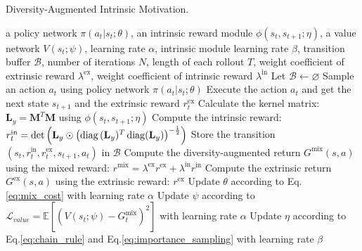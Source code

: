 \begin{algorithm}[t]
	\caption{\label{alg:all} Diversity-Augmented Intrinsic Motivation.
	}
	\begin{algorithmic}[1]
		\REQUIRE a policy network $\pi(a_{t}|s_{t};\theta)$, an intrinsic reward module $\phi(s_{t},s_{t+1};\eta)$, a value network $V(s_{t};\psi)$, learning rate $\alpha$, intrinsic module learning rate $\beta$, transition buffer $\mathcal{B}$, number of iterations $N$, length of each rollout $T$, weight coefficient of extrinsic reward $\lambda^{\text{ex}}$, weight coefficient of intrinsic reward $\lambda^{\text{in}}$
		\STATE Let $\mathcal{B} \leftarrow \varnothing$
        \STATE Sample an action $a_{t}$ using policy network $\pi(a_{t}|s_{t};\theta)$
        \STATE Execute the action $a_{t}$ and get the next state $s_{t+1}$ and the extrinsic reward $r^{\text{ex}}_{t}$
		\STATE Calculate the kernel matrix: $\textbf{L}_{y}=\mathbf{M}^{T}\mathbf{M}$ using $\phi(s_{t},s_{t+1};\eta)$
		\STATE Compute the intrinsic reward: $r_{t}^{\text{in}} = \det\left(\mathbf{L}_{y} \odot \left(\operatorname{diag}{(\mathbf{L}_{y}})^{T}\operatorname{diag}({\mathbf{L}_{y}})\right)^{-\frac{1}{2}}\right)$
		\STATE Store the transition $(s_{t}, r^{\text{in}}_{t}, r^{\text{ex}}_{t}, s_{t+1}, a_{t})$ in $\mathcal{B}$
		\ENDFOR
		\STATE Compute the diversity-augmented return $G^{\text{mix}}(s, a)$ using the mixed reward: $r^{\text{mix}}=\lambda^{\text{ex}}r^{\text{ex}} + \lambda^{\text{in}}r^{\text{in}}$
		\STATE Compute the extrinsic return $G^{\text{ex}}(s, a)$ using the extrinsic reward: $r^{\text{ex}}$
		\STATE Update $\theta$ according to Eq.\eqref{eq:mix_cost} with learning rate $\alpha$
		\STATE Update $\psi$ according to $\mathcal{L}_{value}=\mathbb{E}[(V(s_{t};\psi)-G^{\text{mix}}_{t})^2]$ with learning rate $\alpha$
		\STATE Update $\eta$ according to Eq.\eqref{eq:chain_rule} and Eq.\eqref{eq:importance_sampling} with learning rate $\beta$
        \ENDFOR
	\end{algorithmic}
	\label{algo:vi}
\end{algorithm}
